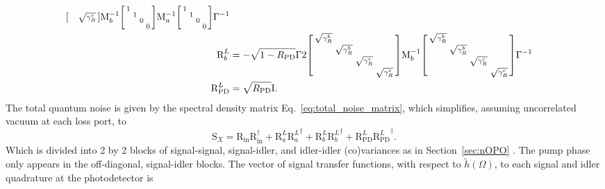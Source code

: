 \begin{align}
\begin{bsmallmatrix}
 &  &  & \sqrt{\gamma^c_R}
\end{bsmallmatrix}\text{M}_b^{-1}\begin{bsmallmatrix}
1 &  &  &  \\
 & 1 &  &  \\
 &  & 0 &  \\
 &  &  & 0
\end{bsmallmatrix}\text{M}_a^{-1}\begin{bsmallmatrix}
1 &  &  &  \\
 & 1 &  &  \\
 &  & 0 &  \\
 &  &  & 0
\end{bsmallmatrix}\Gamma^{-1}\\
\text{R}^L_b&=-\sqrt{1-R_\text{PD}}\Gamma 2\begin{bsmallmatrix}
\sqrt{\gamma^b_R} &  &  &  \\
 & \sqrt{\gamma^b_R} &  &  \\
 &  & \sqrt{\gamma^c_R} &  \\
 &  &  & \sqrt{\gamma^c_R}
\end{bsmallmatrix}\text{M}_b^{-1}\begin{bsmallmatrix}
\sqrt{\gamma^b_R} &  &  &  \\
 & \sqrt{\gamma^b_R} &  &  \\
 &  & \sqrt{\gamma^c_R} &  \\
 &  &  & \sqrt{\gamma^c_R}
\end{bsmallmatrix}\Gamma^{-1}\\
\text{R}^L_\text{PD}&=\sqrt{R_\text{PD}} \text{I}.
\end{align}
\endgroup
The total quantum noise is given by the spectral density matrix Eq.~\ref{eq:total_noise_matrix}, which simplifies, assuming uncorrelated vacuum at each loss port, to
\begin{equation}\label{eq:nIS_Sx}
\text{S}_X=\text{R}_\text{in}\text{R}_\text{in}^\dag+\text{R}^L_a{\text{R}^L_a}^\dag+\text{R}^L_b{\text{R}^L_b}^\dag+\text{R}^L_\text{PD}{\text{R}^L_\text{PD}}^\dag.
\end{equation} %
Which is divided into 2 by 2 blocks of signal-signal, signal-idler, and idler-idler (co)variances as in Section~\ref{sec:nOPO} . The pump phase only appears in the off-diagonal, signal-idler blocks.
The vector of signal transfer functions, with respect to $\tilde h(\Omega)$, to each signal and idler quadrature at the photodetector is
